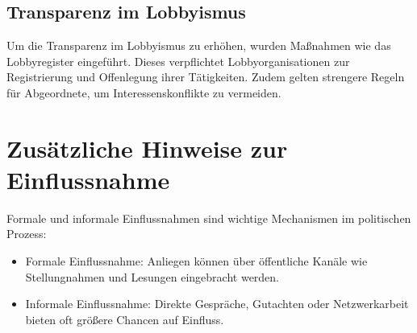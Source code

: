 \documentclass[a4paper,10pt]{article}
\begin{document}
\subsection{Transparenz im Lobbyismus}
Um die Transparenz im Lobbyismus zu erhöhen, wurden Maßnahmen wie das Lobbyregister eingeführt. Dieses verpflichtet Lobbyorganisationen zur Registrierung und Offenlegung ihrer Tätigkeiten. Zudem gelten strengere Regeln für Abgeordnete, um Interessenskonflikte zu vermeiden.

\section*{Zusätzliche Hinweise zur Einflussnahme}
Formale und informale Einflussnahmen sind wichtige Mechanismen im politischen Prozess:
\begin{itemize}
    \item Formale Einflussnahme: Anliegen können über öffentliche Kanäle wie Stellungnahmen und Lesungen eingebracht werden.
    \item Informale Einflussnahme: Direkte Gespräche, Gutachten oder Netzwerkarbeit bieten oft größere Chancen auf Einfluss.
\end{itemize}
\end{document}
